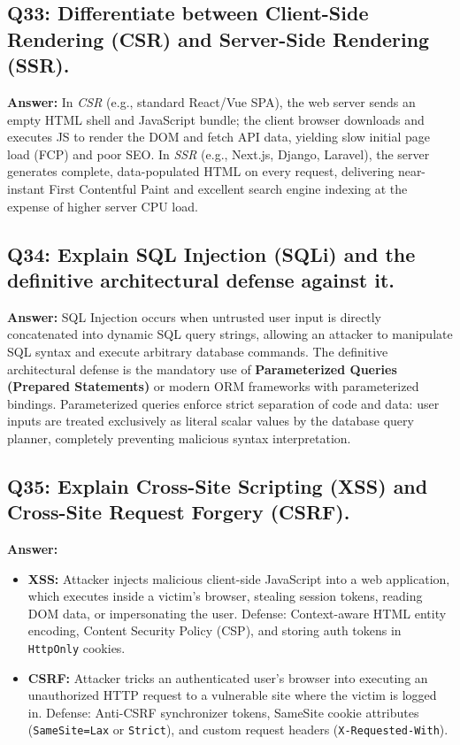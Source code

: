 \subsection*{Q33: Differentiate between Client-Side Rendering (CSR) and Server-Side Rendering (SSR).}
\textbf{Answer:} In \textit{CSR} (e.g., standard React/Vue SPA), the web server sends an empty HTML shell and JavaScript bundle; the client browser downloads and executes JS to render the DOM and fetch API data, yielding slow initial page load (FCP) and poor SEO. In \textit{SSR} (e.g., Next.js, Django, Laravel), the server generates complete, data-populated HTML on every request, delivering near-instant First Contentful Paint and excellent search engine indexing at the expense of higher server CPU load.

\subsection*{Q34: Explain SQL Injection (SQLi) and the definitive architectural defense against it.}
\textbf{Answer:} SQL Injection occurs when untrusted user input is directly concatenated into dynamic SQL query strings, allowing an attacker to manipulate SQL syntax and execute arbitrary database commands. The definitive architectural defense is the mandatory use of \textbf{Parameterized Queries (Prepared Statements)} or modern ORM frameworks with parameterized bindings. Parameterized queries enforce strict separation of code and data: user inputs are treated exclusively as literal scalar values by the database query planner, completely preventing malicious syntax interpretation.

\subsection*{Q35: Explain Cross-Site Scripting (XSS) and Cross-Site Request Forgery (CSRF).}
\textbf{Answer:}
\begin{itemize}
    \item \textbf{XSS:} Attacker injects malicious client-side JavaScript into a web application, which executes inside a victim's browser, stealing session tokens, reading DOM data, or impersonating the user. Defense: Context-aware HTML entity encoding, Content Security Policy (CSP), and storing auth tokens in \lstinline|HttpOnly| cookies.
    \item \textbf{CSRF:} Attacker tricks an authenticated user's browser into executing an unauthorized HTTP request to a vulnerable site where the victim is logged in. Defense: Anti-CSRF synchronizer tokens, SameSite cookie attributes (\lstinline|SameSite=Lax| or \lstinline|Strict|), and custom request headers (\lstinline|X-Requested-With|).
\end{itemize}


